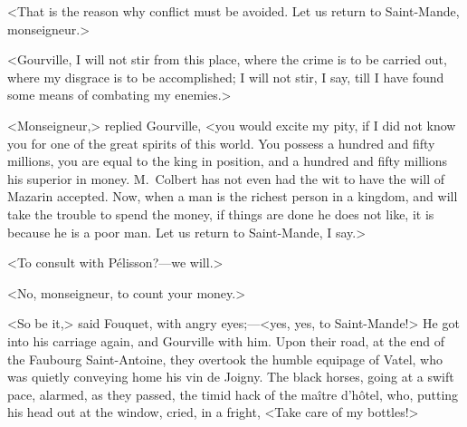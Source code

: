 <That is the reason why conflict must be avoided. Let us return to Saint-Mande, monseigneur.>

<Gourville, I will not stir from this place, where the crime is to be carried out, where my disgrace is to be accomplished; I will not stir, I say, till I have found some means of combating my enemies.>

<Monseigneur,> replied Gourville, <you would excite my pity, if I did not know you for one of the great spirits of this world. You possess a hundred and fifty millions, you are equal to the king in position, and a hundred and fifty millions his superior in money. M.~Colbert has not even had the wit to have the will of Mazarin accepted. Now, when a man is the richest person in a kingdom, and will take the trouble to spend the money, if things are done he does not like, it is because he is a poor man. Let us return to Saint-Mande, I say.>

<To consult with Pélisson?—we will.>

<No, monseigneur, to count your money.>

<So be it,> said Fouquet, with angry eyes;—<yes, yes, to Saint-Mande!> He got into his carriage again, and Gourville with him. Upon their road, at the end of the Faubourg Saint-Antoine, they overtook the humble equipage of Vatel, who was quietly conveying home his vin de Joigny. The black horses, going at a swift pace, alarmed, as they passed, the timid hack of the maître d'hôtel, who, putting his head out at the window, cried, in a fright, <Take care of my bottles!>